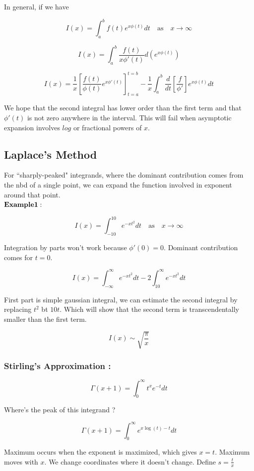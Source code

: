 \documentclass{report}
\begin{document}
\noindent In general, if we have

$$I(x) = \int_{a}^{b} f(t) e^{x\phi(t)} dt \quad\mathrm{as}\quad x\to\infty$$ 

$$I(x) = \int_{a}^{b} \frac{f(t)}{x\phi'(t)} d(e^{x\phi(t)})$$

$$I(x) = \frac{1}{x} \left[\frac{f(t)}{\phi(t)} e^{x\phi'(t)}\right]_{t=a}^{t=b} - \frac{1}{x}\int_{a}^{b}\frac {d}{dt}\left[\frac{f}{\phi'}\right]e^{x\phi(t)}dt $$

We hope that the second integral has lower order than the first term and that $\phi'(t)$ is not zero anywhere in the interval. This will fail when asymptotic expansion involves $log$ or fractional powers of $x$.

\subsection{Laplace's Method}

For ``sharply-peaked" integrands, where the dominant contribution comes from the nbd of a single point, we can expand the function involved in exponent around that point.\\

\noindent $\bold{Example 1 :}$

$$ I(x) = \int_{-10}^{10}e^{-xt^2}dt \quad\mathrm{as}\quad x\to\infty$$

\noindent Integration by parts won't work because $\phi'(0) = 0$. Dominant contribution comes for $t=0$. 

$$I(x) = \int_{-\infty}^{\infty}e^{-xt^2}dt - 2\int_{10}^{\infty}e^{-xt^2}dt$$

\noindent First part is simple gaussian integral, we can estimate the second integral by replacing $t^2$ bt $10t$. Which will show that the second term is transcendentally smaller than the first term.

$$I(x) \sim \sqrt{\frac{\pi}{x}}$$

\subsubsection{Stirling's Approximation :}

$$\Gamma(x+1) = \int_{0}^{\infty}t^x e^{-t}dt$$

\noindent Where's the peak of this integrand ? 

$$ \Gamma(x+1) = \int_{0}^{\infty}e^{x\log(t)-t}dt$$

\noindent Maximum occurs when the exponent is maximized, which gives $x = t$. Maximum moves with $x$. We change coordinates where it doesn't change. Define $ s = \frac{t}{x}$
\end{document}
